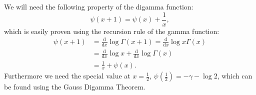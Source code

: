 We will need the following property of the digamma function:
\begin{equation}
  \label{eqn:digamma-recursion}
  \psi(x + 1) = \psi(x) + \frac1x,
\end{equation}
which is easily proven using the recursion rule of the gamma function:
\begin{align*}
  \psi(x+1) &= \frac{\mathrm d}{\mathrm dx}\log{\Gamma(x+1)} = \frac{\mathrm
d}{\mathrm dx}\log{x\Gamma(x)} \\
  &= \frac{\mathrm d}{\mathrm dx}\log{x} + \frac{\mathrm d}{\mathrm
  dx}\log{\Gamma(x)} \\
  &= \frac1x + \psi(x).
\end{align*}
Furthermore we need the special value at $x = \frac12$, $\psi(\frac12) =
-\gamma-\log 2$, which can be found using the Gauss Digamma Theorem.

